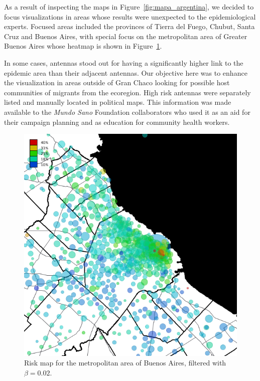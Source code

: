 As a result of inspecting the maps in Figure~\ref{fig:mapa_argentina}, we decided to 
focus visualizations in areas whose results were unexpected to the epidemiological experts. 
Focused areas included the provinces of Tierra del Fuego, Chubut, Santa Cruz and Buenos Aires, with special focus on the metropolitan area of Greater Buenos Aires whose heatmap is shown in Figure~\ref{fig:amba_map}.

In some cases, antennas stood out for having a significantly higher link to the epidemic area than their adjacent antennas. Our objective here was to enhance the visualization in areas outside of Gran Chaco looking for possible host communities of migrants from the ecoregion.
High risk antennas were separately listed and manually located in political maps. This information was made available to the \textit{Mundo Sano} Foundation collaborators who used it as an aid for their campaign planning and as education for community health workers. 


\begin{figure}[p]
	\centering
	\includegraphics[width=0.75\linewidth]
	{figures/201112_hi_res_amba_usuarios_proporcion_circulos_beta2/201112_hi_res_amba_usuarios_proporcion_circulos_beta2}
	\caption{Risk map for the metropolitan area of Buenos Aires, filtered with $\beta = 0.02$.}
	\label{fig:amba_map}
\end{figure}

